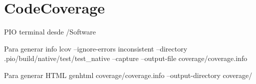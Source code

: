 \chapter{Code\+Coverage}
\hypertarget{md__code_coverage}{}\label{md__code_coverage}
PIO terminal desde /\+Software

Para generar info lcov --ignore-\/errors inconsistent --directory .pio/build/native/test/test\+\_\+native --capture --output-\/file coverage/coverage.\+info

Para generar HTML genhtml coverage/coverage.\+info --output-\/directory coverage/ 